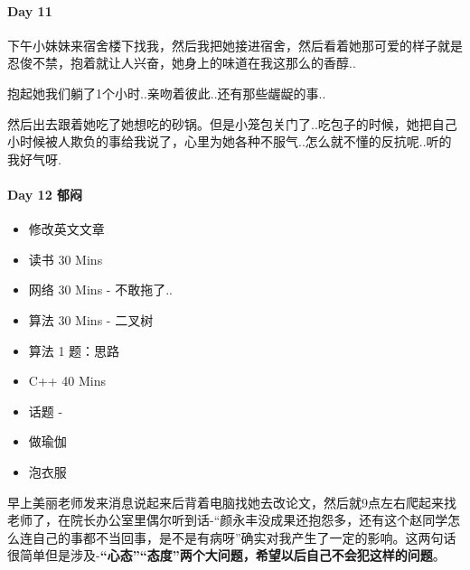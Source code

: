\documentclass[UTF8,a4paper,8pt]{ctexart}
\begin{document}
     \paragraph{Day 11      \quad     }
		    下午小妹妹来宿舍楼下找我，然后我把她接进宿舍，然后看着她那可爱的样子就是忍俊不禁，抱着就让人兴奋，她身上的味道在我这那么的香醇..
		    
		    抱起她我们躺了1个小时..亲吻着彼此..还有那些龌龊的事..
		    
		    然后出去跟着她吃了她想吃的砂锅。但是小笼包关门了..吃包子的时候，她把自己小时候被人欺负的事给我说了，心里为她各种不服气..怎么就不懂的反抗呢..听的我好气呀.
		    
     \paragraph{Day 12   郁闷   \quad     }
	     \begin{itemize}
	     	\item  \makebox[0pt][l]{$\square$}\raisebox{.15ex}{\hspace{0.1em}$\checkmark$}修改英文文章
	     	
	     	\item  \makebox[0pt][l]{$\square$}\raisebox{.15ex}{\hspace{0.1em}$\checkmark$}读书  30 Mins
	     	\item  网络  30 Mins	- 不敢拖了..	 	
	     	\item  算法  30 Mins	- 二叉树
	     	\item  算法  1 题：思路
	     	\item  \makebox[0pt][l]{$\square$}\raisebox{.15ex}{\hspace{0.1em}$\checkmark$}C++   40 Mins
	     	
	     	\item  话题 - 
	     	\item  \makebox[0pt][l]{$\square$}\raisebox{.15ex}{\hspace{0.1em}$\checkmark$}做瑜伽
	     	\item  \makebox[0pt][l]{$\square$}\raisebox{.15ex}{\hspace{0.1em}$\checkmark$}泡衣服
	     \end{itemize}
	     早上美丽老师发来消息说起来后背着电脑找她去改论文，然后就9点左右爬起来找老师了，在院长办公室里偶尔听到话-“颜永丰没成果还抱怨多，还有这个赵同学怎么连自己的事都不当回事，是不是有病呀”确实对我产生了一定的影响。这两句话很简单但是涉及-\textbf{“心态”“态度”两个大问题，希望以后自己不会犯这样的问题}。
	     
\end{document}
